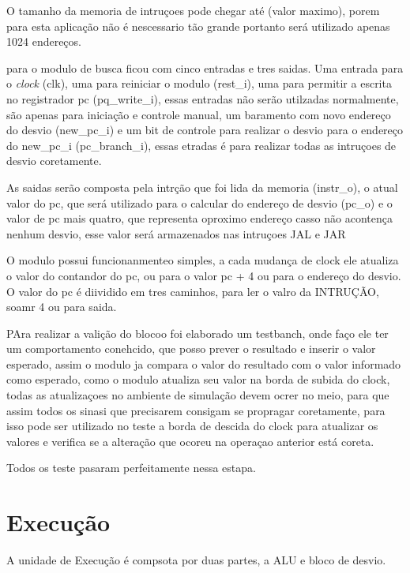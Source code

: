 O tamanho da memoria de intruçoes pode chegar até (valor maximo), porem para esta aplicação não é nescessario tão grande portanto será utilizado apenas 1024 endereços.

para o modulo de busca ficou com cinco entradas e tres saidas. Uma entrada para   o \textit{clock} (clk), uma para reiniciar o modulo (rest_i), uma para permitir a escrita no registrador pc (pq_write_i), essas entradas não serão utilzadas normalmente, são apenas para iniciação e controle manual, um baramento com novo endereço do desvio (new_pc_i) e um bit de controle para realizar o desvio para o endereço do new_pc_i (pc_branch_i), essas etradas é para realizar todas as intruçoes de desvio coretamente.

As saidas serão composta pela intrção que foi lida da memoria (instr_o), o atual valor do pc, que será utilizado para o calcular do endereço de desvio (pc_o) e o valor de pc mais quatro, que representa  oproximo endereço casso não acontença nenhum desvio, esse valor será armazenados nas intruçoes JAL e JAR

O modulo possui funcionanmenteo simples, a cada mudança de clock ele atualiza o valor do contandor do pc, ou para o valor pc + 4 ou para o endereço do desvio. O valor do pc é diividido em tres caminhos, para ler o valro da INTRUÇÃO, soamr 4 ou para saida.

PAra realizar a valição do blocoo foi elaborado um testbanch, onde faço ele ter um comportamento conehcido, que posso prever o resultado e inserir o valor esperado, assim o modulo ja compara o valor do resultado com o valor informado como esperado, como o modulo atualiza seu valor na borda de subida do clock, todas as atualizaçoes no ambiente de simulação devem ocrer no meio, para que assim todos os sinasi que precisarem consigam se propragar coretamente, para isso pode ser utilizado no teste a borda de descida do clock para atualizar os valores e verifica se a alteração que ocoreu na operaçao anterior está coreta.

Todos os teste pasaram perfeitamente nessa estapa.

\section{Execução}
\label{sec:executar}

A unidade de Execução é compsota por duas partes, a ALU e bloco de desvio.

